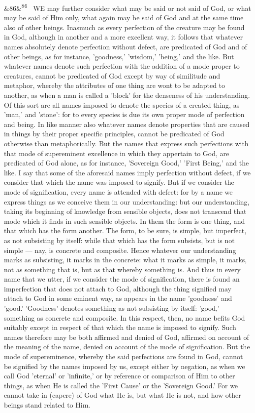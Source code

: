 \documentclass[12pt]{article}
\newcommand{\para}[1][]{\par\noindent\ifx&#1&\else\textsuperscript{\footnotesize #1}~\fi}
\begin{document}
\para[86] WE may further consider what may be said or not said of God, or what may be said of Him only, what again may be said of God and at the same time also of other beings. Inasmuch as every perfection of the creature may be found in God, although in another and a more excellent way, it follows that whatever names absolutely denote perfection without defect, are predicated of God and of other beings, as for instance, 'goodness,' 'wisdom,' 'being,' and the like. But whatever names denote such perfection with the addition of a mode proper to creatures, cannot be predicated of God except by way of similitude and metaphor, whereby the attributes of one thing are wont to be adapted to another, as when a man is called a 'block' for the denseness of his understanding. Of this sort are all names imposed to denote the species of a created thing, as 'man,' and 'stone': for to every species is due its own proper mode of perfection and being. In like manner also whatever names denote properties that are caused in things by their proper specific principles, cannot be predicated of God otherwise than metaphorically. But the names that express such perfections with that mode of supereminent excellence in which they appertain to God, are predicated of God alone, as for instance, 'Sovereign Good,' 'First Being,' and the like. I say that some of the aforesaid names imply perfection without defect, if we consider that which the name was imposed to signify. But if we consider the mode of signification, every name is attended with defect: for by a name we express things as we conceive them in our understanding: but our understanding, taking its beginning of knowledge from sensible objects, does not transcend that mode which it finds in such sensible objects. In them the form is one thing, and that which has the form another. The form, to be sure, is simple, but imperfect, as not subsisting by itself: while that which has the form subsists, but is not simple --- nay, is concrete and composite. Hence whatever our understanding marks as subsisting, it marks in the concrete: what it marks as simple, it marks, not as something that is, but as that whereby something is. And thus in every name that we utter, if we consider the mode of signification, there is found an imperfection that does not attach to God, although the thing signified may attach to God in some eminent way, as appears in the name 'goodness' and 'good.' 'Goodness' denotes something as not subsisting by itself: 'good,' something as concrete and composite. In this respect, then, no name befits God suitably except in respect of that which the name is imposed to signify. Such names therefore may be both affirmed and denied of God, affirmed on account of the meaning of the name, denied on account of the mode of signification. But the mode of supereminence, whereby the said perfections are found in God, cannot be signified by the names imposed by us, except either by negation, as when we call God 'eternal' or 'infinite,' or by reference or comparison of Him to other things, as when He is called the 'First Cause' or the 'Sovereign Good.' For we cannot take in (capere) of God what He is, but what He is not, and how other beings stand related to Him.
\end{document}

